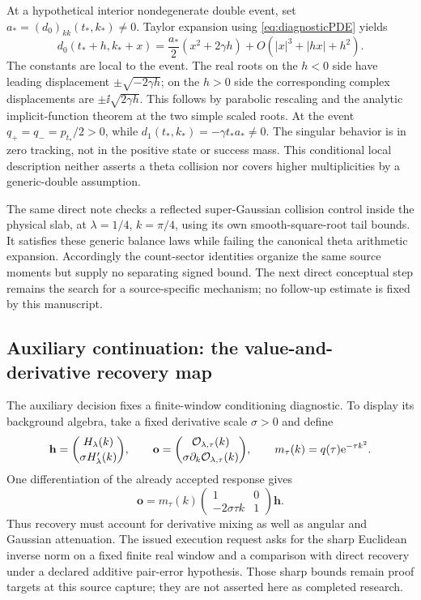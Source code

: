 At a hypothetical interior nondegenerate double event, set
$a_*=(d_0)_{kk}(t_*,k_*)\ne0$. Taylor expansion using
\eqref{eq:diagnosticPDE} yields
\begin{equation}\label{eq:localdouble}
 d_0(t_*+h,k_*+x)
 =\frac{a_*}{2}(x^2+2\gamma h)
   +O(|x|^3+|hx|+h^2).
\end{equation}
The constants are local to the event. The real roots on the $h<0$ side
have leading displacement $\pm\sqrt{-2\gamma h}$; on the $h>0$ side
the corresponding complex displacements are
$\pm\ii\sqrt{2\gamma h}$. This follows by parabolic rescaling and
the analytic implicit-function theorem at the two simple scaled roots.
At the event $q_+=q_-=p_{t_*}/2>0$, while
$d_1(t_*,k_*)=-\gamma t_*a_*\ne0$. The singular behavior is in zero
tracking, not in the positive state or success mass. This conditional
local description neither asserts a theta collision nor covers higher
multiplicities by a generic-double assumption.

The same direct note checks a reflected super-Gaussian collision
control inside the physical slab, at $\lambda=1/4$, $k=\pi/4$, using
its own smooth-square-root tail bounds. It satisfies these generic
balance laws while failing the canonical theta arithmetic expansion.
Accordingly the count-sector identities organize the same source
moments but supply no separating signed bound. The next direct
conceptual step remains the search for a source-specific mechanism;
no follow-up estimate is fixed by this manuscript.

\subsection{Auxiliary continuation: the value-and-derivative recovery map}
The auxiliary decision \cite{TNDAuxConditioning} fixes a finite-window
conditioning diagnostic. To display its background algebra, take a
fixed derivative scale $\sigma>0$ and define
\[
 \mathbf h=\binom{H_\lambda(k)}{\sigma H'_\lambda(k)},\qquad
 \mathbf o=\binom{\mathcal O_{\lambda,\tau}(k)}{\sigma\partial_k\mathcal O_{\lambda,\tau}(k)},
 \qquad m_\tau(k)=q(\tau)\mathrm e^{-\tau k^2}.
\]
One differentiation of the already accepted response gives
\begin{equation}\label{eq:jetmap}
 \mathbf o=m_\tau(k)
 \begin{pmatrix}1&0\\-2\sigma\tau k&1\end{pmatrix}\mathbf h.
\end{equation}
Thus recovery must account for derivative mixing as well as angular and
Gaussian attenuation. The issued execution request asks for the sharp
Euclidean inverse norm on a fixed finite real window and a comparison
with direct recovery under a declared additive pair-error hypothesis.
Those sharp bounds remain proof targets at this source capture; they
are not asserted here as completed research.

